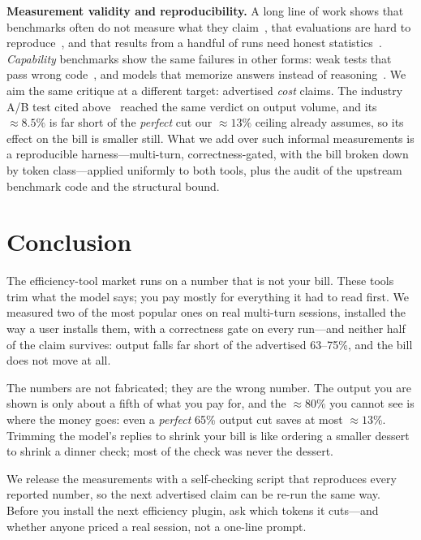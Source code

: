 \textbf{Measurement validity and reproducibility.} A long line of work shows that benchmarks often do
not measure what they claim~\cite{raji2021benchmark,jacobs2021measurement,bean2025construct}, that
evaluations are hard to reproduce~\cite{biderman2024lessons}, and that results from a handful of runs
need honest statistics~\cite{agarwal2021precipice}. \emph{Capability} benchmarks show the same failures
in other forms: weak tests that pass wrong code~\cite{liu2023evalplus}, and models that memorize
answers instead of reasoning~\cite{liang2025swebenchillusion}. We aim the same critique at a different
target: advertised \emph{cost} claims. The industry A/B test cited
above~\cite{jetbrains2026caveman} reached the same verdict on output volume, and its ${\approx}8.5\%$
is far short of the \emph{perfect} cut our ${\approx}13\%$ ceiling already assumes, so its effect on
the bill is smaller still. What we add over such informal measurements is a reproducible
harness---multi-turn, correctness-gated, with the bill broken down by token class---applied uniformly
to both tools, plus the audit of the upstream benchmark code and the structural bound.

\section{Conclusion}
The efficiency-tool market runs on a number that is not your bill. These tools trim what the model
says; you pay mostly for everything it had to read first. We measured two of the most popular ones
on real multi-turn sessions, installed the way a user installs them, with a correctness gate on
every run---and neither half of the claim survives: output falls far short of the
advertised 63--75\%, and the bill does not move at all.

The numbers are not fabricated; they are the wrong number. The output you are shown is only about a
fifth of what you pay for, and the ${\approx}80\%$ you cannot see is where the money goes: even a
\emph{perfect} 65\% output cut saves at most ${\approx}13\%$. Trimming the model's replies to shrink
your bill is like ordering a smaller dessert to shrink a dinner check; most of the check was never
the dessert.

We release the measurements with a self-checking script that reproduces every reported number, so
the next advertised claim can be re-run the same way. Before you
install the next efficiency plugin, ask which tokens it cuts---and whether anyone priced a real
session, not a one-line prompt.

